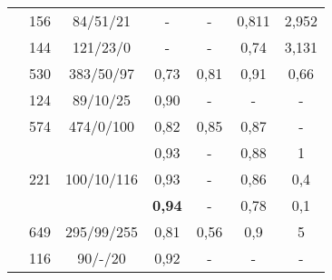 \begin{table}[ht]
\begin{tabular}{ccccccc}
\multirow{2}{*}{\cite{Liew:2022}}       & 156                  & 84/51/21                    & -    & -     & 0,811 & 2,952 \\
                              & 144                  & 121/23/0                    & -    & -     & 0,74  & 3,131 \\
\cite{Chartrand:2022}                   & 530                  & 383/50/97                   & 0,73 & 0,81  & 0,91  & 0,66  \\
\cite{Jalalifar:2022}                   & 124                  & 89/10/25                    & 0,90 & -     & -     & -     \\
\cite{Lee:2022}                         & 574                  & 474/0/100                   & 0,82 & 0,85  & 0,87  & -     \\
\multirow{3}{*}{\cite{Ottesen:2023}}      & \multirow{3}{*}{221} & \multirow{3}{*}{100/10/116} & 0,93 & -     & 0,88  & 1     \\
                              &                      &                             & 0,93 & -     & 0,86  & 0,4   \\
                              &                      &                             & \textbf{0,94} & -     & 0,78  & 0,1   \\
\cite{Li:2023}                          & 649                  & 295/99/255                  & 0,81 & 0,56  & 0,9   & 5     \\
\cite{Jalalifar:2023}                     & 116                  & 90/-/20                    & 0,92 & -     & -     & -     \\ \hline
\end{tabular}
\label{tab:literatura}
\end{table}
